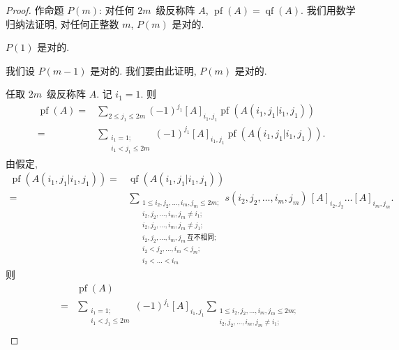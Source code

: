 \documentclass[../libro]{subfiles}
\begin{document}
\begin{proof}
    作命题 \(P(m)\):
    对任何 \(2m\)~级反称阵 \(A\),
    \(\operatorname{pf} {(A)} = \operatorname{qf} {(A)}\).
    我们用数学归纳法证明,
    对任何正整数 \(m\),
    \(P(m)\) 是对的.

    \(P(1)\) 是对的.

    我们设 \(P(m-1)\) 是对的.
    我们要由此证明, \(P(m)\) 是对的.

    任取 \(2m\)~级反称阵 \(A\).
    记 \(i_1 = 1\).
    则
    \begin{align*}
        \operatorname{pf} {(A)}
        = {} &
        \sum_{2 \leq j_1 \leq 2m}
        {(-1)^{j_1} [A]_{i_1,j_1}
        \operatorname{pf} {(A({i_1,j_1}|{i_1,j_1}))}}
        \\
        = {} &
        \sum_{\substack{
        i_1 = 1; \\
            i_1 < j_1 \leq 2m
        }}
        {(-1)^{j_1} [A]_{i_1,j_1}
        \operatorname{pf} {(A({i_1,j_1}|{i_1,j_1}))}}.
    \end{align*}
    由假定,
    \begin{align*}
        \operatorname{pf} {(A({i_1,j_1}|{i_1,j_1}))}
        = {} &
        \operatorname{qf} {(A({i_1,j_1}|{i_1,j_1}))}
        \\
        = {} &
        \sum_{\substack{
        1 \leq i_2, j_2, \dots, i_m, j_m \leq 2m; \\
        i_2, j_2, \dots, i_m, j_m \neq i_1;       \\
        i_2, j_2, \dots, i_m, j_m \neq j_1;       \\
        i_2, j_2, \dots, i_m, j_m\,\text{互不相同};   \\
        i_2 < j_2, \dots, i_m < j_m;              \\
                i_2 < \dots < i_m
            }}
        {s(i_2, j_2, \dots, i_m, j_m)\,
            [A]_{i_2,j_2} \dots [A]_{i_m,j_m}}.
    \end{align*}
    则
    \begin{align*}
             &
        \operatorname{pf} {(A)}
        \\
        = {} &
        \sum_{\substack{
        i_1 = 1;                                            \\
                i_1 < j_1 \leq 2m
            }}
        (-1)^{j_1} [A]_{i_1,j_1}
        \sum_{\substack{
        1 \leq i_2, j_2, \dots, i_m, j_m \leq 2m;           \\
        i_2, j_2, \dots, i_m, j_m \neq i_1;                 \\
}}
\end{align*}
\end{proof}
\end{document}
